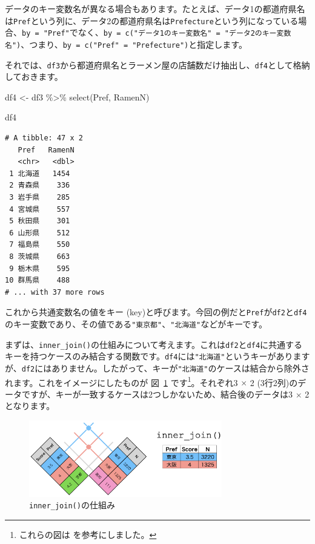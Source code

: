 \documentclass[
  a4paper,
  pandoc,
  ja=standard,
  jafont=haranoaji]{bxjsbook}
\newenvironment{Shaded}{\begin{snugshade}}{\end{snugshade}}
\newcommand{\FunctionTok}[1]{\textcolor[rgb]{0.28,0.35,0.67}{#1}}
\newcommand{\NormalTok}[1]{\textcolor[rgb]{0.00,0.48,0.65}{#1}}
\newcommand{\OtherTok}[1]{\textcolor[rgb]{0.00,0.48,0.65}{#1}}
\newcommand{\SpecialCharTok}[1]{\textcolor[rgb]{0.37,0.37,0.37}{#1}}
\begin{document}
データのキー変数名が異なる場合もあります。たとえば、データ1の都道府県名は\texttt{Pref}という列に、データ2の都道府県名は\texttt{Prefecture}という列になっている場合、\texttt{by\ =\ "Pref"}でなく、\texttt{by\ =\ c("データ1のキー変数名"\ =\ "データ2のキー変数名")}、つまり、\texttt{by\ =\ c("Pref"\ =\ "Prefecture")}と指定します。

それでは、\texttt{df3}から都道府県名とラーメン屋の店舗数だけ抽出し、\texttt{df4}として格納しておきます。

\begin{Shaded}
\begin{Highlighting}[numbers=left,,]
\NormalTok{df4 }\OtherTok{\textless{}{-}}\NormalTok{ df3 }\SpecialCharTok{\%\textgreater{}\%}
  \FunctionTok{select}\NormalTok{(Pref, RamenN)}

\NormalTok{df4}
\end{Highlighting}
\end{Shaded}

\begin{verbatim}
# A tibble: 47 x 2
   Pref   RamenN
   <chr>   <dbl>
 1 北海道   1454
 2 青森県    336
 3 岩手県    285
 4 宮城県    557
 5 秋田県    301
 6 山形県    512
 7 福島県    550
 8 茨城県    663
 9 栃木県    595
10 群馬県    488
# ... with 37 more rows
\end{verbatim}

これから共通変数名の値をキー
(key)と呼びます。今回の例だと\texttt{Pref}が\texttt{df2}と\texttt{df4}のキー変数であり、その値である\texttt{"東京都"}、\texttt{"北海道"}などがキーです。

まずは、\texttt{inner\_join()}の仕組みについて考えます。これは\texttt{df2}と\texttt{df4}に共通するキーを持つケースのみ結合する関数です。\texttt{df4}には\texttt{"北海道"}というキーがありますが、\texttt{df2}にはありません。したがって、キーが\texttt{"北海道"}のケースは結合から除外されます。これをイメージにしたものが
図~\ref{fig-handling2_merge_inner} です\footnote{これらの図は
  \citet{Grolemund_Wickham:2016} を参考にしました。}。それぞれ3
\(\times\) 2
(3行2列)のデータですが、キーが一致するケースは2つしかないため、結合後のデータは3
\(\times\) 2となります。

\begin{figure}

{\centering \includegraphics[width=0.75\textwidth,height=\textheight]{./Figs/Handling2/Merge_Inner.png}

}

\caption{\label{fig-handling2_merge_inner}\texttt{inner\_join()}の仕組み}

\end{figure}
\end{document}
